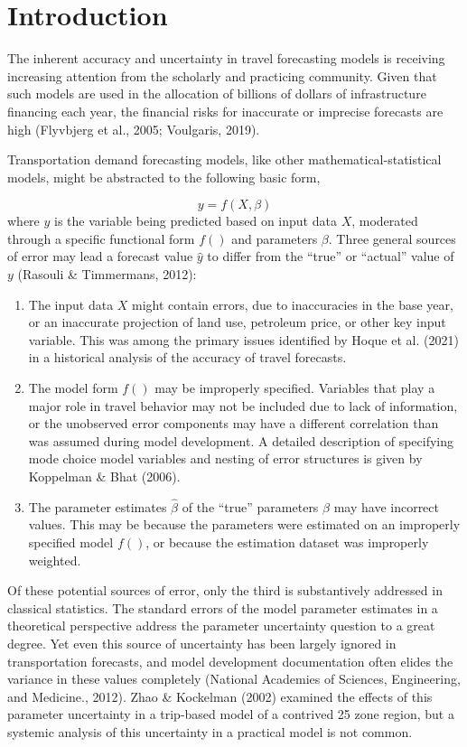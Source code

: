 \documentclass[
  letterpaper,
  authoryear,
  review,
  3p]{elsarticle}
\providecommand{\tightlist}{%
  \setlength{\itemsep}{0pt}\setlength{\parskip}{0pt}}\usepackage{longtable,booktabs,array}
\begin{document}
\hypertarget{introduction}{%
\section{Introduction}\label{introduction}}

The inherent accuracy and uncertainty in travel forecasting models is
receiving increasing attention from the scholarly and practicing
community. Given that such models are used in the allocation of billions
of dollars of infrastructure financing each year, the financial risks
for inaccurate or imprecise forecasts are high (Flyvbjerg et al., 2005;
Voulgaris, 2019).

Transportation demand forecasting models, like other
mathematical-statistical models, might be abstracted to the following
basic form,

\[
y = f(X, \beta)
\]where \(y\) is the variable being predicted based on input data \(X\),
moderated through a specific functional form \(f()\) and parameters
\(\beta\). Three general sources of error may lead a forecast value
\(\hat{y}\) to differ from the ``true'' or ``actual'' value of \(y\)
(Rasouli \& Timmermans, 2012):

\begin{enumerate}
\def\labelenumi{\arabic{enumi}.}
\tightlist
\item
  The input data \(X\) might contain errors, due to inaccuracies in the
  base year, or an inaccurate projection of land use, petroleum price,
  or other key input variable. This was among the primary issues
  identified by Hoque et al. (2021) in a historical analysis of the
  accuracy of travel forecasts.
\item
  The model form \(f()\) may be improperly specified. Variables that
  play a major role in travel behavior may not be included due to lack
  of information, or the unobserved error components may have a
  different correlation than was assumed during model development. A
  detailed description of specifying mode choice model variables and
  nesting of error structures is given by Koppelman \& Bhat (2006).
\item
  The parameter estimates \(\hat{\beta}\) of the ``true'' parameters
  \(\beta\) may have incorrect values. This may be because the
  parameters were estimated on an improperly specified model \(f()\), or
  because the estimation dataset was improperly weighted.
\end{enumerate}

Of these potential sources of error, only the third is substantively
addressed in classical statistics. The standard errors of the model
parameter estimates in a theoretical perspective address the parameter
uncertainty question to a great degree. Yet even this source of
uncertainty has been largely ignored in transportation forecasts, and
model development documentation often elides the variance in these
values completely (National Academies of Sciences, Engineering, and
Medicine., 2012). Zhao \& Kockelman (2002) examined the effects of this
parameter uncertainty in a trip-based model of a contrived 25 zone
region, but a systemic analysis of this uncertainty in a practical model
is not common.
\end{document}
